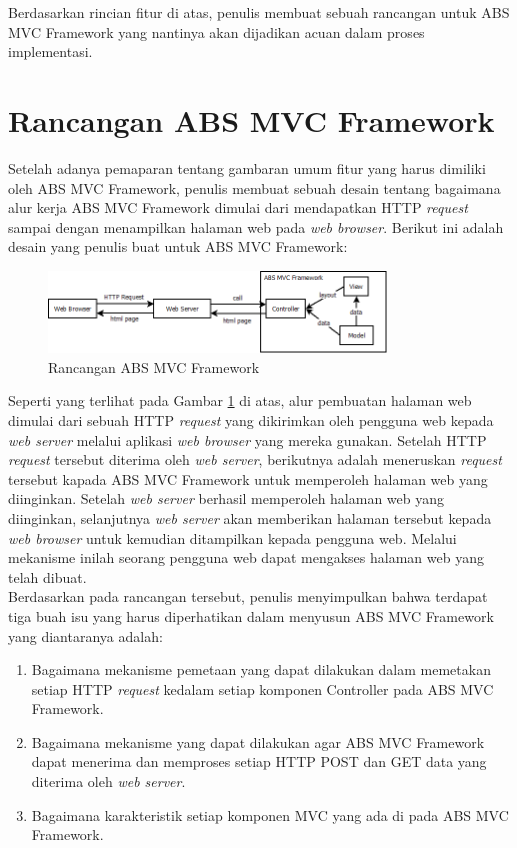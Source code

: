Berdasarkan rincian fitur di atas, penulis membuat sebuah rancangan untuk ABS MVC Framework yang nantinya akan dijadikan acuan dalam proses implementasi.

\section{Rancangan ABS MVC Framework}

Setelah adanya pemaparan tentang gambaran umum fitur yang harus dimiliki oleh ABS MVC Framework, penulis membuat sebuah desain tentang bagaimana alur kerja ABS MVC Framework dimulai dari mendapatkan HTTP \textit{request} sampai dengan menampilkan halaman web pada \textit{web browser}. Berikut ini adalah desain yang penulis buat untuk ABS MVC Framework:

\begin{figure}
    \centering
    \includegraphics[width=0.8\textwidth]{img/abs-mvc.png}
    \caption{Rancangan ABS MVC Framework}
    \label{fig:mvcFrameworkDesign}
\end{figure}

Seperti yang terlihat pada Gambar \ref{fig:mvcFrameworkDesign} di atas, alur pembuatan halaman web dimulai dari sebuah HTTP \textit{request} yang dikirimkan oleh pengguna web kepada \textit{web server} melalui aplikasi \textit{web browser} yang mereka gunakan. Setelah HTTP \textit{request} tersebut diterima oleh \textit{web server}, berikutnya adalah meneruskan \textit{request} tersebut kapada ABS MVC Framework untuk memperoleh halaman web yang diinginkan. Setelah \textit{web server} berhasil memperoleh halaman web yang diinginkan, selanjutnya \textit{web server} akan memberikan halaman tersebut kepada \textit{web browser} untuk kemudian ditampilkan kepada pengguna web. Melalui mekanisme inilah seorang pengguna web dapat mengakses halaman web yang telah dibuat.\\

Berdasarkan pada rancangan tersebut, penulis menyimpulkan bahwa terdapat tiga buah isu yang harus diperhatikan dalam menyusun ABS MVC Framework yang diantaranya adalah:

\begin{enumerate}
    \item Bagaimana mekanisme pemetaan yang dapat dilakukan dalam memetakan setiap HTTP \textit{request} kedalam setiap komponen Controller pada ABS MVC Framework.
    \item Bagaimana mekanisme yang dapat dilakukan agar ABS MVC Framework dapat menerima dan memproses setiap HTTP POST dan GET data yang diterima oleh \textit{web server}.
    \item Bagaimana karakteristik setiap komponen MVC yang ada di pada ABS MVC Framework.
\end{enumerate}

